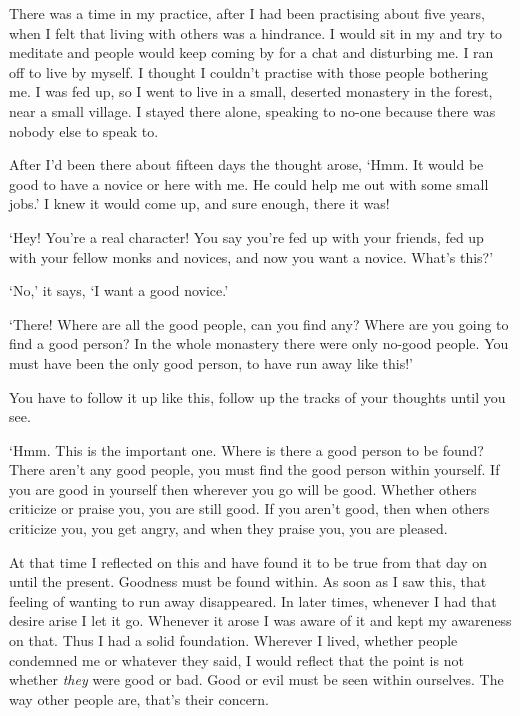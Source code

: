 There was a time in my practice, after I had been practising about five years, when I felt that living with others was a hindrance. I would sit in my  and try to meditate and people would keep coming by for a chat and disturbing me. I ran off to live by myself. I thought I couldn't practise with those people bothering me. I was fed up, so I went to live in a small, deserted monastery in the forest, near a small village. I stayed there alone, speaking to no-one because there was nobody else to speak to.

After I'd been there about fifteen days the thought arose, `Hmm. It would be good to have a novice or \textit{} here with me. He could help me out with some small jobs.' I knew it would come up, and sure enough, there it was!

`Hey! You're a real character! You say you're fed up with your friends, fed up with your fellow monks and novices, and now you want a novice. What's this?'

`No,' it says, `I want a good novice.'

`There! Where are all the good people, can you find any? Where are you going to find a good person? In the whole monastery there were only no-good people. You must have been the only good person, to have run away like this!'

You have to follow it up like this, follow up the tracks of your thoughts until you see.

`Hmm. This is the important one. Where is there a good person to be found? There aren't any good people, you must find the good person within yourself. If you are good in yourself then wherever you go will be good. Whether others criticize or praise you, you are still good. If you aren't good, then when others criticize you, you get angry, and when they praise you, you are pleased.

At that time I reflected on this and have found it to be true from that day on until the present. Goodness must be found within. As soon as I saw this, that feeling of wanting to run away disappeared. In later times, whenever I had that desire arise I let it go. Whenever it arose I was aware of it and kept my awareness on that. Thus I had a solid foundation. Wherever I lived, whether people condemned me or whatever they said, I would reflect that the point is not whether \textit{they} were good or bad. Good or evil must be seen within ourselves. The way other people are, that's their concern.

